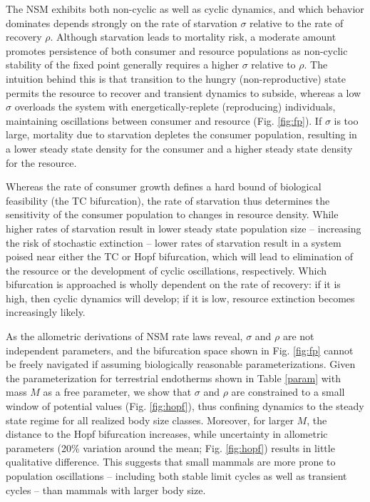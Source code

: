 \documentclass{pnastwo}
\begin{document}
\begin{article}
The NSM exhibits both non-cyclic as well as cyclic dynamics, and which behavior dominates depends strongly on the rate of starvation $\sigma$ relative to the rate of recovery $\rho$.
Although starvation leads to mortality risk, a moderate amount promotes persistence of both consumer and resource populations as non-cyclic stability of the fixed point generally requires a higher $\sigma$ relative to $\rho$.
The intuition behind this is that transition to the hungry (non-reproductive) state permits the resource to recover and transient dynamics to subside, whereas a low $\sigma$ overloads the system with energetically-replete (reproducing) individuals, maintaining oscillations between consumer and resource (Fig. \ref{fig:fp}).
If $\sigma$ is too large, mortality due to starvation depletes the consumer population, resulting in a lower steady state density for the consumer and a higher steady state density for the resource.

Whereas the rate of consumer growth defines a hard bound of biological feasibility (the TC bifurcation), the rate of starvation thus determines the sensitivity of the consumer population to changes in resource density.
While higher rates of starvation result in lower steady state population size -- increasing the risk of stochastic extinction -- lower rates of starvation result in a system poised near either the TC or Hopf bifurcation, which will lead to elimination of the resource or the development of cyclic oscillations, respectively.
Which bifurcation is approached is wholly dependent on the rate of recovery: if it is high, then cyclic dynamics will develop; if it is low, resource extinction becomes increasingly likely.


As the allometric derivations of NSM rate laws reveal, $\sigma$ and $\rho$ are not independent parameters, and the bifurcation space shown in Fig. \ref{fig:fp} cannot be freely navigated if assuming biologically reasonable parameterizations.
Given the parameterization for terrestrial endotherms shown in Table \ref{param} with mass $M$ as a free parameter, we show that $\sigma$ and $\rho$ are constrained to a small window of potential values (Fig. \ref{fig:hopf}), thus confining dynamics to the steady state regime for all realized body size classes.
Moreover, for larger $M$, the distance to the Hopf bifurcation increases, while uncertainty in allometric parameters (20\% variation around the mean; Fig. \ref{fig:hopf}) results in little qualitative difference.
This suggests that small mammals are more prone to population oscillations -- including both stable limit cycles as well as transient cycles -- than mammals with larger body size. %



\end{article}
\end{document}
